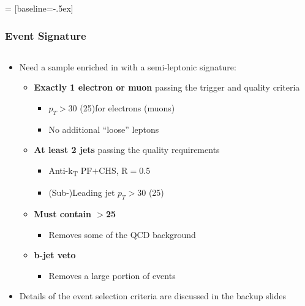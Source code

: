 \begin{frame}%
	\setlength{\leftmargini}{0.5cm}
	\setlength{\leftmarginii}{0.5cm}
	\setlength{\leftmarginiii}{0.5cm}
	 = [baseline=-.5ex]
	\frametitle{Event Signature}
	\vspace*{-0.24cm}
	\begin{columns}[T]
		\begin{column}{0.5\textwidth}
			\vspace*{-0.25cm}
			\begin{block}{}
				\begin{itemize}
					\item Need a sample enriched in \HWW with a semi-leptonic signature:
					\begin{itemize}
						\item<2-> \textbf{Exactly 1 electron or muon} passing{} the trigger and quality criteria
						\begin{itemize}
							\item<2-> $p_{T}>$30 (25)\gev for electrons (muons)
							\item<2-> No additional ``loose'' leptons
						\end{itemize}
						\item<3-> \textbf{At least 2 jets} passing the quality{} requirements
						\begin{itemize}
							\item<3-> Anti-k\textsubscript{T} PF$+$CHS, R$=$0.5
							\item<3-> (Sub-)Leading jet $p_{T}>$30 (25)\gev
						\end{itemize}
						\item<4-> \textbf{Must contain \ETslash$>$25\gev}{}
						\begin{itemize}
							\item<4-> Removes some of the QCD background
						\end{itemize}
						\item<5-> \textbf{b-jet veto}{}
						\begin{itemize}
							\item Removes a large portion of \ttbar events
						\end{itemize}
					\end{itemize}
					\item<6-> Details of the \HWWlvjj event selection criteria are discussed in the backup slides

\end{itemize}
\end{block}
\end{column}
\end{columns}
\end{frame}
